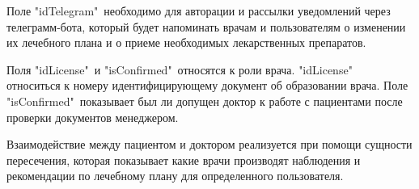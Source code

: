         \begin{table}[H]
            \caption{Описание атрибутов сущности "Пользователь".}
            \label{user-attrs-table}
        \end{table}

        Поле "idTelegram"\ необходимо для авторации и рассылки уведомлений через %
        телеграмм-бота, который будет напоминать врачам и пользователям о изменении их %
        лечебного плана и о приеме необходимых лекарственных препаратов. 

        Поля "idLicense"\ и "isConfirmed"\ относятся к роли врача. "idLicense"\ %
        относиться к номеру идентифицирующему документ об образовании врача. %
        Поле "isConfirmed"\ показывает был ли допущен доктор к работе с пациентами после %
        проверки документов менеджером. 

    \newpage

    Взаимодействие между пациентом и доктором реализуется при помощи сущности пересечения, %
    которая показывает какие врачи производят наблюдения и рекомендации по лечебному плану для %
    определенного пользователя.

